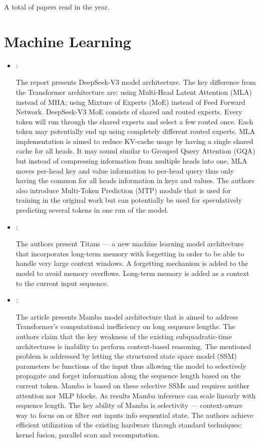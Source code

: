 



A total of  papers read in the year.

\section*{Machine Learning}
\begin{itemize}
    \item \cite{DeepSeekAI:2025:DeepSeekV3}:

    The report presents DeepSeek-V3 model architecture. The key difference from the Transformer architecture are: using Multi-Head Latent Attention (MLA) instead of MHA; using Mixture of Experts (MoE) instead of Feed Forward Network. DeepSeek-V3 MoE consists of shared and routed experts. Every token will run through the shared experts and select a few routed once. Each token may potentially end up using completely different routed experts. MLA implementation is aimed to reduce KV-cache usage by having a single shared cache for all heads. It may sound similar to Grouped Query Attention (GQA) but instead of compressing information from multiple heads into one, MLA moves per-head key and value information to per-head query thus only having the common for all heads information in keys and values. The authors also introduce Multi-Token Prediction (MTP) module that is used for training in the original work but can potentially be used for speculatively predicting several tokens in one run of the model.

    \item \cite{Behrouz:Titans:2024}:

    The authors present Titans --- a new machine learning model architecture that incorporates long-term memory with forgetting in order to be able to handle very large context windows. A forgetting mechanism is added to the model to avoid memory overflows. Long-term memory is added as a context to the current input sequence.

    \item \cite{Gu:Mamba:2024}:

    The article presents Mamba model architecture that is aimed to address Transformer's computational inefficiency on long sequence lengths. The authors claim that the key weakness of the existing subquadratic-time architectures is inability to perform context-based reasoning. The mentioned problem is addressed by letting the structured state space model (SSM) parameters be functions of the input thus allowing the model to selectively propagate and forget information along the sequence length based on the current token. Mamba is based on these selective SSMs and requires neither attention nor MLP blocks. As results Mamba inference can scale linearly with sequence length. The key ability of Mamba is selectivity --- context-aware way to focus on or filter out inputs info sequential state. The authors achieve efficient utilization of the existing hardware through standard techniques: kernel fusion, parallel scan and recomputation.


\end{itemize}
